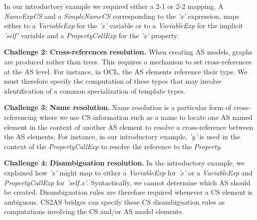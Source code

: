 \documentclass{llncs}
\begin{document}
In our introductory example we required either a 2-1 or 2-2 mapping. A \textit{NameExpCS} and a \textit{SimpleNameCS} corresponding to the \textit{'x'} expression, maps either to a \textit{VariableExp} for the  \textit{'x'} variable or to a \textit{VariableExp} for the implicit \textit{'self'} variable and a \textit{PropertyCallExp} for the \textit{'x'} property.

\textbf{Challenge 2: Cross-references resolution.}
When creating AS models, graphs are produced rather than trees. This requires a mechanism to set cross-references at the AS level. For instance, in OCL, the AS elements reference their type. We must therefore specify the computation of these types that may involve identification of a common specialization of template types.


\textbf{Challenge 3: Name resolution.}
Name resolution is a particular form of cross-referencing where we use CS information such as a name to locate one AS named element in the context of another AS element to resolve a cross-reference between the AS elements. For instance, in our introductory example, \textit{'y'} is used in the context of the \textit{PropertyCallExp} to resolve the reference to the \textit{Property}.


\textbf{Challenge 4: Disambiguation resolution.}
In the introductory example, we explained how \textit{'x'} might map to either a \textit{VariableExp} for \textit{'x'} or a \textit{VariableExp} and \textit{PropertyCallExp} for \textit{'self.x'}. Syntactically, we cannot determine which AS should be created. Disambiguation rules are therefore required whenever a CS element is ambiguous. CS2AS bridges can specify these CS disambiguation rules as computations involving the CS and/or AS model elements.

\end{document}
